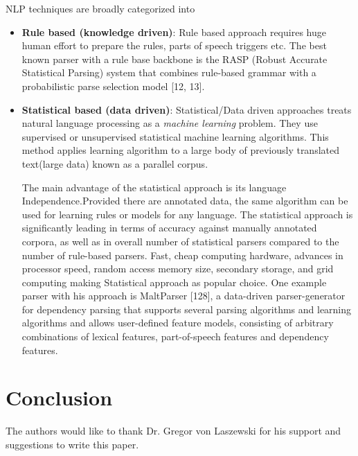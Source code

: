 \documentclass[sigconf]{acmart}
\begin{document}
NLP techniques are broadly categorized into 

  \begin{itemize}
   \item \textbf{Rule based (knowledge driven)}:
   Rule based approach requires huge human effort to prepare the rules, parts of speech triggers etc. The  best  known  parser  with  a  rule  base  backbone  is  the  RASP  (Robust Accurate Statistical Parsing) system that combines rule-based grammar with a probabilistic parse selection model [12, 13].
   \item \textbf{Statistical based (data driven)}:
   Statistical/Data driven approaches treats natural language processing as a \textit{machine learning} problem. They use supervised or unsupervised statistical machine learning algorithms. This method applies learning algorithm to a large body of previously translated text(large data) known as a parallel corpus. 
   
   The main advantage of the statistical approach is its language Independence.Provided there are annotated data, the same algorithm can be used for learning rules or models for any language. The statistical approach is significantly  leading in terms of accuracy against manually annotated corpora, as well as in overall number of statistical parsers compared to the number of rule-based parsers. Fast, cheap computing hardware, advances in processor speed, random access memory size, secondary storage, and grid computing making Statistical approach as popular choice. One example parser with his approach is MaltParser [128], a data-driven parser-generator for dependency parsing  that  supports  several  parsing  algorithms  and  learning  algorithms and allows user-defined feature models, consisting of arbitrary combinations of lexical features, part-of-speech features and dependency features.
  \end{itemize} 
     
\section{Conclusion}


\begin{acks}

  The authors would like to thank Dr. Gregor von Laszewski for his support and suggestions to write this paper.

\end{acks}


 

\appendix
\end{document}
